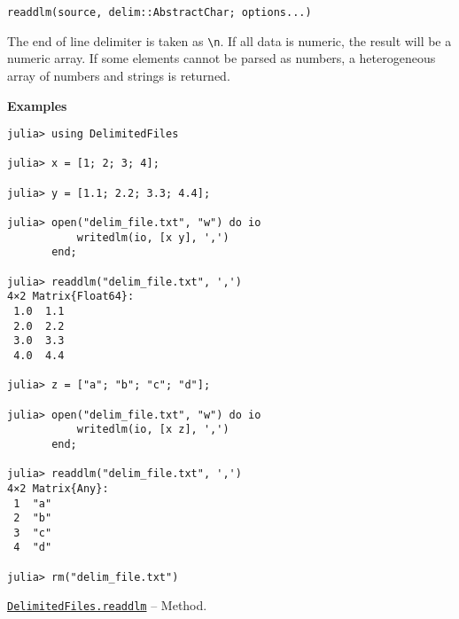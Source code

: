 \begin{adjustwidth}{2em}{0pt}


\begin{verbatim}
readdlm(source, delim::AbstractChar; options...)
\end{verbatim}

The end of line delimiter is taken as \texttt{{\textbackslash}n}. If all data is numeric, the result will be a numeric array. If some elements cannot be parsed as numbers, a heterogeneous array of numbers and strings is returned.

\textbf{Examples}


\begin{verbatim}
julia> using DelimitedFiles

julia> x = [1; 2; 3; 4];

julia> y = [1.1; 2.2; 3.3; 4.4];

julia> open("delim_file.txt", "w") do io
           writedlm(io, [x y], ',')
       end;

julia> readdlm("delim_file.txt", ',')
4×2 Matrix{Float64}:
 1.0  1.1
 2.0  2.2
 3.0  3.3
 4.0  4.4

julia> z = ["a"; "b"; "c"; "d"];

julia> open("delim_file.txt", "w") do io
           writedlm(io, [x z], ',')
       end;

julia> readdlm("delim_file.txt", ',')
4×2 Matrix{Any}:
 1  "a"
 2  "b"
 3  "c"
 4  "d"

julia> rm("delim_file.txt")
\end{verbatim}



\end{adjustwidth}
\hypertarget{7659184717429354788}{}
\hyperlink{7659184717429354788}{\texttt{DelimitedFiles.readdlm}}  -- {Method.}

